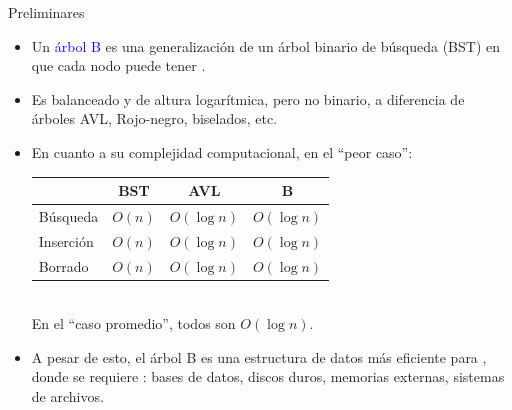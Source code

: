 \documentclass[handout]{beamer} %
\newcommand{\blue}[1]{\textcolor{blue}{#1}}
\newcommand{\redb}[1]{{\color{red!70!black}{#1}}}
\begin{document}
\begin{frame}{Preliminares}
    \begin{itemize}
        \item<1-> Un \blue{árbol B} es una generalización de un árbol binario de búsqueda (BST) en que cada nodo puede tener \redb{$> 2$ hijos}.
        \item<2-> Es balanceado y de altura logarítmica, pero no binario, a diferencia de árboles AVL, Rojo-negro, biselados, etc.
        \item<3-> En cuanto a su complejidad computacional, en el ``peor caso'':
        \begin{tabular}{l|ccc}
                      & BST    & AVL         & B \\\hline
            Búsqueda  & $O(n)$ & $O(\log n)$ & $O(\log n)$\\
            Inserción & $O(n)$ & $O(\log n)$ & $O(\log n)$\\
            Borrado   & $O(n)$ & $O(\log n)$ & $O(\log n)$\\
        \end{tabular}\\[1.2ex]
        
        En el ``caso promedio'', todos son $O(\log n)$.
        \item<4-> A pesar de esto, el árbol B es una estructura de datos más eficiente para \redb{gandes volúmen de datos}, donde se requiere \redb{disminuir el número de accesos}: bases de datos, discos duros, memorias externas, sistemas de archivos.
    \end{itemize}
\end{frame}
\end{document}
